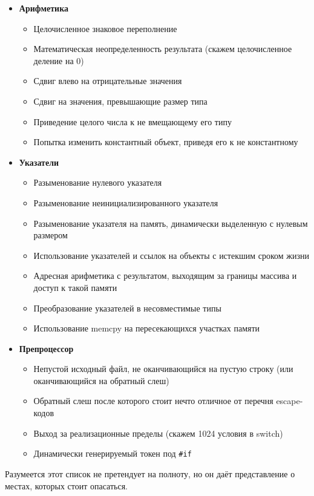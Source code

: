 \documentclass[a4paper,12pt,oneside]{article}
\begin{document}
\begin {itemize}
\item \textbf {Арифметика}
\begin {itemize}
\item Целочисленное знаковое переполнение
\item Математическая неопределенность результата (скажем целочисленное деление на 0)
\item Сдвиг влево на отрицательные значения
\item Сдвиг на значения, превышающие размер типа
\item Приведение целого числа к не вмещающему его типу
\item Попытка изменить константный объект, приведя его к не константному
\end {itemize}
\item \textbf {Указатели}
\begin {itemize}
\item Разыменование нулевого указателя
\item Разыменование неинициализированного указателя
\item Разыменование указателя на память, динамически выделенную с нулевым размером
\item Использование указателей и ссылок на объекты с истекшим сроком жизни
\item Адресная арифметика с результатом, выходящим за границы массива и доступ к такой памяти
\item Преобразование указателей в несовместимые типы
\item Использование memcpy на пересекающихся участках памяти
\end {itemize}
\item \textbf {Препроцессор}
\begin {itemize}
\item Непустой исходный файл, не оканчивающийся на пустую строку (или оканчивающийся на обратный слеш)
\item Обратный слеш после которого стоит нечто отличное от перечня escape-кодов
\item Выход за реализационные пределы (скажем 1024 условия в switch)
\item Динамически генерируемый токен под \lstinline!#if!
\end {itemize}
\end {itemize}

Разумеется этот список не претендует на полноту, но он даёт представление о местах, которых стоит опасаться.
\end{document}

